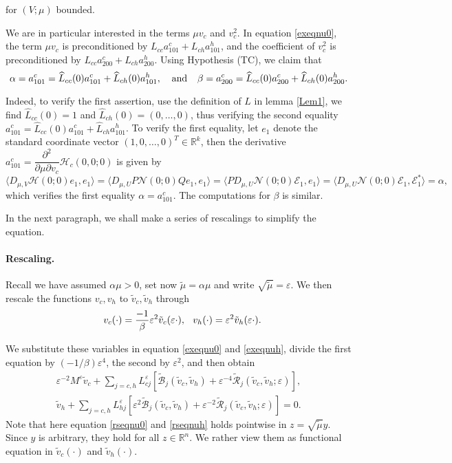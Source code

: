 \documentclass[letterpaper,11pt]{article}
\newcommand{\R}{\mathbb{R}}
\newcommand{\rmO}{\mathcal{O}}
\newcommand{\eps}{\varepsilon}
\newcommand{\B}{\mathcal{B}}
\newcommand{\Rm}{\mathcal{R}}
\newcommand{\Nl}{\mathcal{N}}
\numberwithin{equation}{section}
\theoremstyle{plain}
\theoremstyle{remark}
\begin{document}
for $(V;\mu)$ bounded.

We are in particular interested in the terms $\mu v_c$ and $v_c^2$. In equation \eqref{exeqnu0}, the term $\mu v_c$ is preconditioned by $L_{cc}a_{101}^c+L_{ch}a_{101}^h$, and the coefficient of $v_c^2$ is preconditioned by $L_{cc}a_{200}^c+L_{ch}a_{200}^h$. Using Hypothesis (TC), we claim that
\[
\alpha = a_{101}^c =\widehat{L}_{cc}(0)a_{101}^c+\widehat{L}_{ch}(0)a_{101}^h , \hspace{0.1in}\text{ and }\hspace{0.1in}
\beta =a_{200}^c =\widehat{L}_{cc}(0)a_{200}^c+\widehat{L}_{ch}(0)a_{200}^h .
\]

Indeed, to verify the first assertion, use the definition of $L$ in lemma \ref{Lem1}, we find $\widehat{L}_{cc}(0)=1$ and $\widehat{L}_{ch}(0)=(0,\ldots,0)$, thus verifying the second equality $a_{101}^c=\widehat{L}_{cc}(0)a_{101}^c+\widehat{L}_{ch}a_{101}^h$. 
To verify the first equality, let $e_1$ denote the standard coordinate vector $(1,0,\ldots,0)^T \in \R^k$, then the derivative 
$a_{101}^c=\dfrac{\partial^2}{\partial \mu \partial v_c}  \mathcal{H}_c(0,0;0)$ is given by
\[
\langle D_{\mu,V}\mathcal{H}(0;0)e_1,e_1\rangle=\langle D_{\mu,U} P\Nl(0;0)Q e_1,e_1\rangle = \langle PD_{\mu,U}\Nl(0;0) \mathcal{E}_1,e_1\rangle  = \langle D_{\mu,U}\Nl(0;0)\mathcal{E}_1,\mathcal{E}_1^*\rangle = \alpha,
\]
which verifies the first equality $\alpha=a_{101}^c$. The computations for $\beta$ is similar.

In the next paragraph, we shall make a series of rescalings to simplify the equation.

\paragraph{Rescaling.} Recall we have assumed $\alpha \mu > 0$, set now $\tilde{\mu} = \alpha \mu$ and write $\sqrt{\tilde{\mu}} = \eps$. We then rescale the functions $v_c, v_h$ to $\tilde{v}_c,\tilde{v}_h$ through 
\[
\hspace{0.1in} v_c(\cdot)=\frac{-1}{\beta}\eps^2\tilde{v}_c(\eps \cdot), \hspace{0.1in} v_h(\cdot)=\eps^2 \tilde{v}_h(\eps \cdot).
\]


We substitute these variables in equation \eqref{exeqnu0} and \eqref{exeqnuh}, divide the first equation by $(-1/\beta)\eps^4$, the second by $\eps^2$, and then obtain
\begin{align}
\eps^{-2}M^\eps \tilde{v}_c + \sum_{j=c,h} L_{cj}^{\eps}[\tilde{\B}_j(\tilde{v}_c,\tilde{v}_h)+\eps^{-4}\tilde{\Rm}_j(\tilde{v}_c,\tilde{v}_h;\eps)],\label{rseqnu0}\\
\tilde{v}_h +\sum_{j=c,h} L_{hj}^{\eps}[\eps^2\tilde{\B}_j(\tilde{v}_c,\tilde{v}_h)+\eps^{-2}\tilde{\Rm}_j(\tilde{v}_c,\tilde{v}_h;\eps)] = 0. \label{rseqnuh}
\end{align}
Note that here equation \eqref{rseqnu0} and \eqref{rseqnuh} holds pointwise in $z = \sqrt{\tilde{\mu}} y$. Since $y$ is arbitrary, they hold for all $z \in \R^n$. We rather view them as functional equation in $\tilde{v}_c(\cdot)$ and $\tilde{v}_h(\cdot)$.
\end{document}
